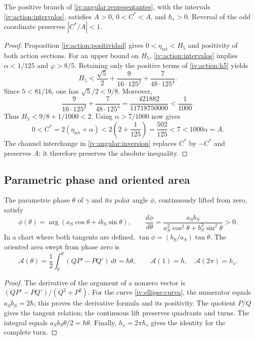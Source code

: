 \begin{proposition}
\label{iv:ellipse:pertenencia}
The positive branch of \eqref{iv:angular:representantes}, with the
intervals \eqref{iv:action:intervalos}, satisfies
\(A>0\), \(0<C^*<A\), and \(\hbar_s>0\).
Reversal of the odd coordinate preserves \(|C^*/A|<1\).
\end{proposition}
\begin{proof}
Proposition \ref{iv:action:positividad} gives
\(0<\eta_{\mathrm{ret}}<H_5\) and positivity of both
action sections. For an upper bound on \(H_5\),
\eqref{iv:action:intervalos} implies
\(\alpha<1/125\) and \(\varphi>8/5\). Retaining only
the positive terms of \eqref{iv:action:h5} yields
\[
 H_5<
 \frac{\sqrt5}{2}+
 \frac{9}{16\cdot125^2}+
 \frac{7}{48\cdot125^4}.
\]
Since \(5<81/16\), one has \(\sqrt5/2<9/8\). Moreover,
\[
 \frac{9}{16\cdot125^2}+
 \frac{7}{48\cdot125^4}
 =\frac{421882}{11718750000}<\frac1{1000}.
\]
Thus \(H_5<9/8+1/1000<2\). Using
\(\alpha>7/1000\) now gives
\[
 0<C^*=2(\eta_{\mathrm{ret}}+\alpha)
 <2\left(2+\frac1{125}\right)=\frac{502}{125}
 <7<1000\alpha=A.
\]
The channel interchange in
\ref{iv:angular:inversion} replaces \(C^*\) by \(-C^*\)
and preserves \(A\); it therefore preserves the absolute inequality.
\end{proof}

\subsection{Parametric phase and oriented area}
\label{iv:ellipse:area}

\begin{proposition}
\label{iv:ellipse:ley-areal}
The parametric phase \(\theta\) of \(\gamma\) and its polar
angle \(\phi\), continuously lifted from zero, satisfy
\begin{equation}
 \phi(\theta)=\arg(a_S\cos\theta+i b_S\sin\theta),\qquad
 \frac{d\phi}{d\theta}
 =\frac{a_Sb_S}{a_S^2\cos^2\theta+b_S^2\sin^2\theta}>0.
 \label{iv:ellipse:fases}
\end{equation}
In a chart where both tangents are defined,
\(\tan\phi=(b_S/a_S)\tan\theta\). The oriented area swept
from phase zero is
\begin{equation}
 \mathcal A(\theta)=
 \frac12\int_0^\theta(QP'-PQ')\,dt=\hbar\theta,
 \qquad
 \mathcal A(1)=\hbar,\quad\mathcal A(2\pi)=h_s.
 \label{iv:ellipse:area-fase}
\end{equation}
\end{proposition}
\begin{proof}
The derivative of the argument of a nonzero vector is
\((QP'-PQ')/(Q^2+P^2)\). For the curve
\eqref{iv:ellipse:curva}, the numerator equals
\(a_Sb_S=2\hbar\); this proves the derivative formula and its
positivity. The quotient \(P/Q\) gives the tangent relation;
the continuous lift preserves quadrants and turns.
The integral equals \(a_Sb_S\theta/2=\hbar\theta\).
Finally, \(h_s=2\pi\hbar_s\) gives the identity for
the complete turn.
\end{proof}

